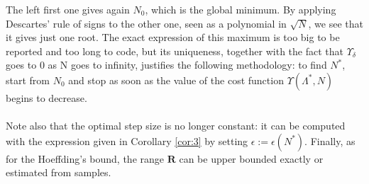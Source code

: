 The left first one gives again $N_0$, which is the global minimum. By applying Descartes' rule of signs to the other one, seen as a polynomial in $\sqrt{N}$, we see that it gives just one root. The exact expression of this maximum is too big to be reported and too long to code, but its uniqueness, together with the fact that $\Upsilon_{\delta}$ goes to $0$ as N goes to infinity, justifies the following methodology: to find $N^*$, start from $N_0$ and stop as soon as the value of the cost function $\Upsilon(\Lambda^*,N)$ begins to decrease.
\paragraph{}
Note also that the optimal step size is no longer constant: it can be computed with the expression given in Corollary \ref{cor:3} by setting $\epsilon := \epsilon(N^*)$.
Finally, as for the Hoeffding's bound, the range $\mathbf{R}$ can be upper bounded exactly or estimated from samples.

